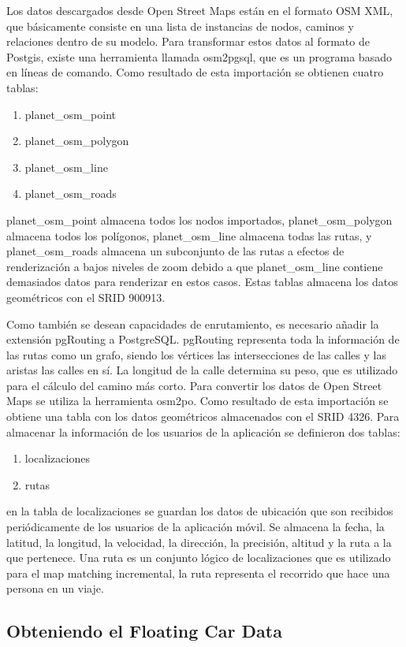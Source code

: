 Los datos descargados desde Open Street Maps están en el formato OSM XML, que básicamente consiste en una lista de instancias de nodos, caminos y relaciones dentro de su modelo. Para transformar estos datos al formato de Postgis, existe una herramienta llamada osm2pgsql, que es un programa basado en líneas de comando. Como resultado de esta importación se obtienen cuatro tablas:
\begin{enumerate}
\item planet\_osm\_point 
\item planet\_osm\_polygon
\item planet\_osm\_line
\item planet\_osm\_roads
\end{enumerate}
planet\_osm\_point almacena todos los nodos importados, planet\_osm\_polygon almacena todos los polígonos, planet\_osm\_line almacena todas las rutas, y planet\_osm\_roads almacena un subconjunto de las rutas a efectos de renderización a bajos niveles de zoom debido a que planet\_osm\_line contiene demasiados datos para renderizar en estos casos. Estas tablas almacena los datos geométricos con el SRID 900913.

Como también se desean capacidades de enrutamiento, es necesario añadir la extensión pgRouting a PostgreSQL. pgRouting representa toda la información de las rutas como un grafo, siendo los vértices las intersecciones de las calles y las aristas las calles en sí. La longitud de la calle determina su peso, que es utilizado para el cálculo del camino más corto. Para convertir los datos de Open Street Maps se utiliza la herramienta osm2po. Como resultado de esta importación se obtiene una tabla con los datos geométricos almacenados con el SRID 4326.
Para almacenar la información de los usuarios de la aplicación se definieron dos tablas:
\begin{enumerate}
\item localizaciones
\item rutas
\end{enumerate}
en la tabla de localizaciones se guardan los datos de ubicación que son recibidos periódicamente de los usuarios de la aplicación móvil. Se almacena la fecha, la latitud, la longitud, la velocidad, la dirección, la precisión, altitud y la ruta a la que pertenece. Una ruta es un conjunto lógico de localizaciones que es utilizado para el map matching incremental, la ruta representa el recorrido que hace una persona en un viaje.

\subsection{Obteniendo el Floating Car Data}
\label{floating-car-data}

